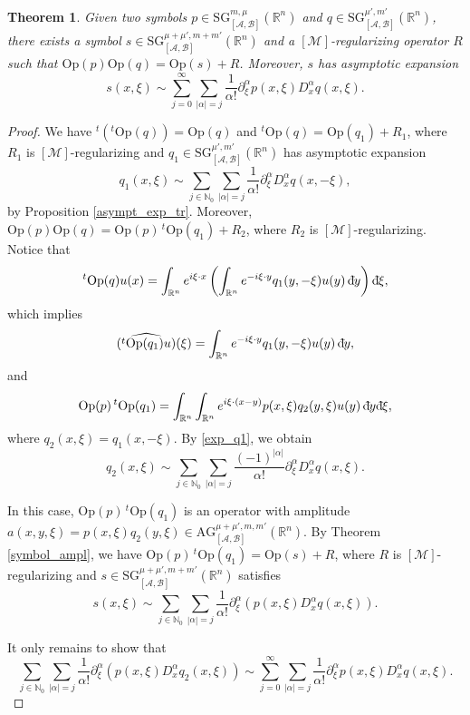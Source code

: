 \documentclass[11pt,reqno]{amsart}
\numberwithin{equation}{section}
\newcommand{\dbar}{\mathrm{d}\hspace*{-0.15em}\bar{}\hspace*{0.1em}}
\newtheorem{theorem}{Theorem}[section]
\newcommand{\R}{{\mathbb{R}}} %
\newcommand{\N}{{\mathbb{N}}} %
\newcommand{\Op}{{\mathrm{Op}}}
\newcommand{\SG}{{\mathrm{SG}}}
\newcommand{\AG}{{\mathrm{AG}}}
\newcommand{\M}{{\mathcal{M}}} %
\newcommand{\A}{{\mathcal{A}}} %
\newcommand{\B}{{\mathcal{B}}} %
\begin{document}
\begin{theorem}\label{asympt_exp_comp}
	Given two symbols $p\in {\SG}_{[\A,\B]}^{m,\mu}(\mathbb{R}^n)$ and $q\in {\SG}_{[\A,\B]}^{\mu',m'}(\mathbb{R}^n)$, there exists a symbol $s\in {\SG}_{[\A,\B]}^{\mu+\mu',m+m'}(\mathbb{R}^n)$ and a $[\M]$-regularizing operator $R$ such that $\mathrm{Op}(p)\mathrm{Op}(q)=\Op(s)+R$. Moreover, $s$ has asymptotic expansion
	\begin{equation*}
		s(x,\xi)\sim \sum_{j=0}^\infty\sum_{|\alpha|=j}\frac{1}{\alpha!}\partial_\xi^\alpha p(x,\xi)D_x^\alpha q(x,\xi).
	\end{equation*}
\end{theorem}
%
\begin{proof}
	We have ${}^t({}^t\Op(q))=\Op(q)$ and ${}^t\Op(q)=\Op(q_1)+R_1$, where $R_1$ is $[\M]$-regularizing and $q_1\in {\SG}_{[\A,\B]}^{\mu',m'}(\R^n)$ has asymptotic expansion
	\begin{equation}\label{exp_q1}
		q_1(x,\xi) \sim \sum_{j\in\N_0}\sum_{|\alpha|=j}\frac{1}{\alpha!}\partial_\xi^\alpha D_x^\alpha q(x,-\xi),
	\end{equation}
	by Proposition \ref{asympt_exp_tr}.
	Moreover, $\Op(p)\Op(q) = \Op(p)\,{}^t\Op(q_1)+R_2$, where $R_2$ is $[\M]$-regularizing. Notice that
	\[{}^t\Op(q)u(x) = \int_{\R^n} e^{i\xi\cdot x}\left(\int_{\R^n}e^{-i\xi\cdot y}q_1(y,-\xi)u(y)\,\dbar y\right)\dbar\xi,\]
	which implies
	\[\widehat{({}^t\Op(q_1)u)}(\xi) = \int_{\R^n}e^{-i\xi\cdot y}q_1(y,-\xi)u(y)\,\dbar y,\]
	and
	\[\Op(p)\,{}^t\Op(q_1) = \int_{\R^n}\int_{\R^n} e^{i\xi\cdot(x-y)}p(x,\xi)q_2(y,\xi)u(y)\,\dbar y\dbar\xi,\]
	where $q_2(x,\xi)=q_1(x,-\xi)$. By \eqref{exp_q1}, we obtain
	\begin{equation}\label{exp_q2}
		q_2(x,\xi) \sim \sum_{j\in\N_0}\sum_{|\alpha|=j}\frac{(-1)^{|\alpha|}}{\alpha!}\partial_\xi^\alpha D_x^\alpha q(x,\xi).
	\end{equation}
	
	In this case, $\Op(p)\,{}^t\Op(q_1)$ is an operator with amplitude $a(x,y,\xi) = p(x,\xi)q_2(y,\xi)\in \AG_{[\A,\B]}^{\mu+\mu',m,m'}(\R^n)$. By Theorem \ref{symbol_ampl}, we have $\Op(p)\,{}^t\Op(q_1) = \Op(s)+R$, where $R$ is $[\M]$-regularizing and $s\in {\SG}_{[\A,\B]}^{\mu+\mu',m+m'}(\R^n)$ satisfies
	\[s(x,\xi) \sim \sum_{j\in\N_0}\sum_{|\alpha|=j}\frac{1}{\alpha!}\partial_\xi^\alpha\left( p(x,\xi) D_x^\alpha q(x,\xi)\right).\]
	
	It only remains to show that
	\[\sum_{j\in\N_0}\sum_{|\alpha|=j}\frac{1}{\alpha!}\partial_\xi^\alpha\left( p(x,\xi) D_x^\alpha q_2(x,\xi)\right) \sim \sum_{j=0}^\infty\sum_{|\alpha|=j}\frac{1}{\alpha!}\partial_\xi^\alpha p(x,\xi)D_x^\alpha q(x,\xi).\]
	

\end{proof}
\end{document}
